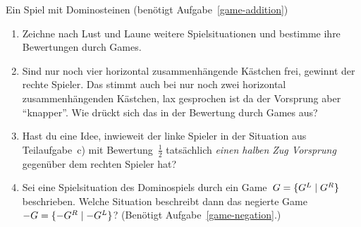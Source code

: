 \documentclass{zirkelblatt}
\begin{document}
\begin{aufgabe}{Ein Spiel mit Dominosteinen (benötigt Aufgabe~\ref{game-addition})}
\begin{enumerate}
von Teilaufgabe~c) sofort das Game zu folgender Situation anzugeben. Welcher
Spieler besitzt eine Gewinnstrategie?
\[
  \begin{Young}
    \cr
    \cr
    &\cr
  \end{Young}
  \begin{array}{@{}c@{}}\begin{Young}
    &&&\cr
  \end{Young}\\[7.2em]\end{array}
  \hspace{-3.7em}
  \begin{Young}
    \cr
    \cr
  \end{Young}
\]
\vspace{-5em}
\item Zeichne nach Lust und Laune weitere Spielsituationen und bestimme ihre
Bewertungen durch Games.
\item Sind nur noch vier horizontal zusammenhängende Kästchen frei, gewinnt der
rechte Spieler. Das stimmt auch bei nur noch zwei horizontal zusammenhängenden
Kästchen, lax gesprochen ist da der Vorsprung aber "`knapper"'. Wie drückt
sich das in der Bewertung durch Games aus?
\item Hast du eine Idee, inwieweit der linke Spieler in der Situation aus Teilaufgabe~c) mit
Bewertung~$\tfrac{1}{2}$ tatsächlich \emph{einen halben Zug Vorsprung}
gegenüber dem rechten Spieler hat?
\item Sei eine Spielsituation des Dominospiels durch ein Game~$G =
\{ G^L \mathrel{|} G^R \}$ beschrieben.
Welche Situation beschreibt dann das negierte Game~$-G = \{ -G^R \mathrel{|} -G^L \}$?
(Benötigt Aufgabe~\ref{game-negation}.)
\end{enumerate}
\end{aufgabe}
\end{document}
